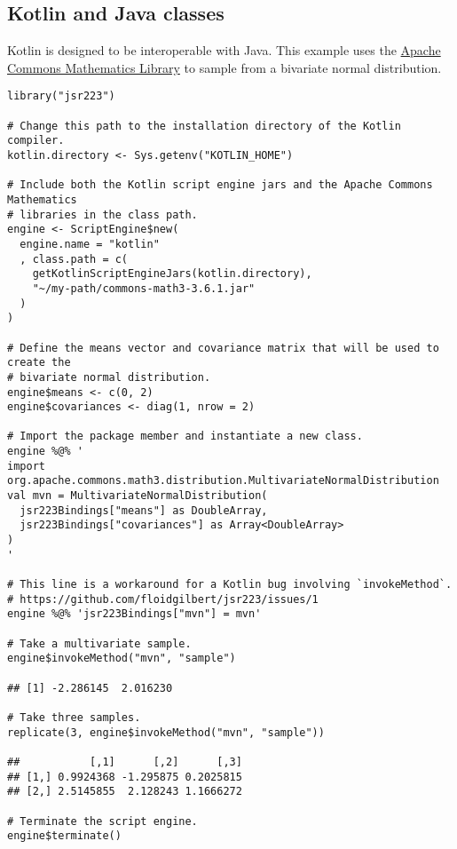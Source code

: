 \subsection{Kotlin and Java classes}

Kotlin is designed to be interoperable with Java. This example uses the \href{http://commons.apache.org/proper/commons-math/}{Apache Commons Mathematics Library} to sample from a bivariate normal distribution.

\begin{verbatim}
library("jsr223")

# Change this path to the installation directory of the Kotlin compiler.
kotlin.directory <- Sys.getenv("KOTLIN_HOME")

# Include both the Kotlin script engine jars and the Apache Commons Mathematics
# libraries in the class path.
engine <- ScriptEngine$new(
  engine.name = "kotlin"
  , class.path = c(
    getKotlinScriptEngineJars(kotlin.directory),
    "~/my-path/commons-math3-3.6.1.jar"
  )
)

# Define the means vector and covariance matrix that will be used to create the
# bivariate normal distribution.
engine$means <- c(0, 2)
engine$covariances <- diag(1, nrow = 2)

# Import the package member and instantiate a new class.
engine %@% '
import org.apache.commons.math3.distribution.MultivariateNormalDistribution
val mvn = MultivariateNormalDistribution(
  jsr223Bindings["means"] as DoubleArray,
  jsr223Bindings["covariances"] as Array<DoubleArray>
)
'

# This line is a workaround for a Kotlin bug involving `invokeMethod`.
# https://github.com/floidgilbert/jsr223/issues/1
engine %@% 'jsr223Bindings["mvn"] = mvn'

# Take a multivariate sample.
engine$invokeMethod("mvn", "sample")

## [1] -2.286145  2.016230

# Take three samples.
replicate(3, engine$invokeMethod("mvn", "sample"))

##           [,1]      [,2]      [,3]
## [1,] 0.9924368 -1.295875 0.2025815
## [2,] 2.5145855  2.128243 1.1666272

# Terminate the script engine.
engine$terminate()
\end{verbatim}



